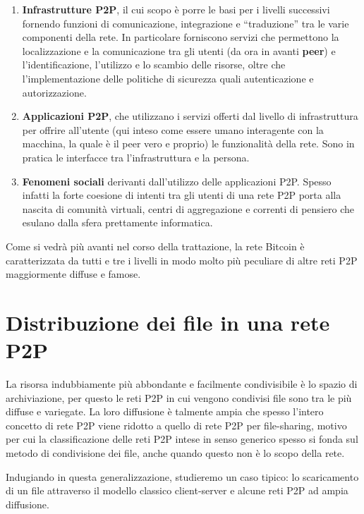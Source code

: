 \begin{enumerate}
\def\labelenumi{\arabic{enumi}.}
\item
  \textbf{Infrastrutture P2P}, il cui scopo è porre le basi per i   livelli successivi fornendo funzioni di comunicazione, integrazione e   ``traduzione'' tra le varie componenti della rete. In particolare   forniscono servizi che permettono la localizzazione e la comunicazione   tra gli utenti (da ora in avanti \textbf{peer}) e l'identificazione,   l'utilizzo e lo scambio delle risorse, oltre che l'implementazione   delle politiche di sicurezza quali autenticazione e autorizzazione.
\item
  \textbf{Applicazioni P2P}, che utilizzano i servizi offerti dal   livello di infrastruttura per offrire all'utente (qui inteso come   essere umano interagente con la macchina, la quale è il peer vero e   proprio) le funzionalità della rete. Sono in pratica le interfacce tra   l'infrastruttura e la persona.
\item
  \textbf{Fenomeni sociali} derivanti dall'utilizzo delle applicazioni   P2P. Spesso infatti la forte coesione di intenti tra gli utenti di una   rete P2P porta alla nascita di comunità virtuali, centri di   aggregazione e correnti di pensiero che esulano dalla sfera   prettamente informatica.
\end{enumerate}

Come si vedrà più avanti nel corso della trattazione, la rete Bitcoin è caratterizzata da tutti e tre i livelli in modo molto più peculiare di altre reti P2P maggiormente diffuse e famose.

\section{Distribuzione dei file in una rete P2P}\label{distribuzione-dei-file-in-una-rete-p2p}

La risorsa indubbiamente più abbondante e facilmente condivisibile è lo spazio di archiviazione, per questo le reti P2P in cui vengono condivisi file sono tra le più diffuse e variegate. La loro diffusione è talmente ampia che spesso l'intero concetto di rete P2P viene ridotto a quello di rete P2P per file-sharing, motivo per cui la classificazione delle reti P2P intese in senso generico spesso si fonda sul metodo di condivisione dei file, anche quando questo non è lo scopo della rete.

Indugiando in questa generalizzazione, studieremo un caso tipico: lo scaricamento di un file attraverso il modello classico client-server e alcune reti P2P ad ampia diffusione.

